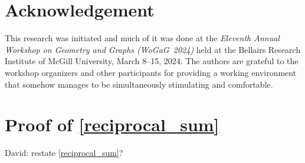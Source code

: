 \documentclass{patmorin}
\newcommand{\david}[1]{{\color{orange} David: #1}}
\begin{document}
\section*{Acknowledgement}

This research was initiated and much of it was done at the \emph{Eleventh Annual Workshop on Geometry and Graphs (WoGaG~2024)} held at the Bellairs Research Institute of McGill University, March 8--15, 2024. The authors are grateful to the workshop organizers and other participants for providing a working environment that somehow manages to be simultaneously stimulating and comfortable.





\appendix

\section{Proof of \cref{reciprocal_sum}}
\label{reciprocal_sum_section}

\david{restate \cref{reciprocal_sum}?}
\end{document}
